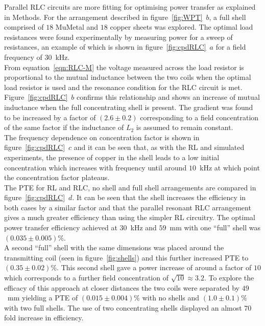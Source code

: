 \documentclass[11pt]{iopart}
\begin{document}
Parallel RLC circuits are more fitting for optimising power
transfer as explained in Methods. For the arrangement
described in figure~\ref{fig:WPT}~$b$, a full shell comprised of $18$
MuMetal and $18$ copper sheets was explored. The optimal load
resistances were found experimentally by measuring power for a sweep
of resistances, an example of which is shown in
figure~\ref{fig:cpdRLC}~$a$ for a field frequency of $30$~kHz.\\
From equation~\ref{eqn:RLC-M} the voltage measured across the load
resistor is proportional to the mutual inductance between the two
coils when the optimal load resistor is used and the resonance
condition for the RLC circuit is met. Figure~\ref{fig:cpdRLC}~$b$
confirms this relationship and shows an increase of mutual inductance
when the full concentrating shell is present. The gradient was found
to be increased by a factor of $(2.6 \pm 0.2)$ corresponding to a field
concentration of the same factor if the inductance of $L_2$ is assumed
to remain constant. \\
The frequency dependence on concentration factor is shown in
figure~\ref{fig:cpdRLC}~$c$ and it can be seen that, as with the RL and
simulated experiments, the presence of copper in the shell leads to a
low initial concentration which increases with frequency until around
$10$~kHz at which point the concentration factor plateaus.\\
The PTE for RL and RLC, no shell and full shell arrangements are
compared in figure~\ref{fig:cpdRLC}~$d$. It can be seen that the shell
increases the efficiency in both cases by a similar factor and that
the parallel resonant RLC arrangement gives a much greater efficiency
than using the simpler RL circuitry. The optimal power transfer
efficiency achieved at $30$~kHz and $59$~mm with one ``full'' shell was
$(0.035\pm0.005)\%$. \\ A second ``full'' shell with the same
dimensions was placed around the transmitting coil (seen in figure~\ref{fig:shells}) and this further
increased PTE to $(0.35\pm0.02)\%$. This second shell gave a power
increase of around a factor of $10$ which corresponds to a further
field concentration of $\sqrt{10} \approx 3.2$. To explore the
efficacy of this approach at closer distances the two coils were
separated by $49$~mm yielding a PTE of $(0.015\pm0.004)\%$ with no
shells and $(1.0\pm0.1)\%$ with two full shells. The use of two
concentrating shells displayed an almost $70$ fold increase in
efficiency.
\end{document}
